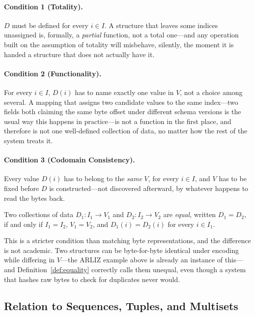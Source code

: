 \paragraph{Condition 1 (Totality).}
$D$ must be defined for every $i \in I$. A structure that leaves some
indices unassigned is, formally, a \emph{partial} function, not a total
one---and any operation built on the assumption of totality will misbehave,
silently, the moment it is handed a structure that does not actually have it.

\paragraph{Condition 2 (Functionality).}
For every $i \in I$, $D(i)$ has to name exactly one value in $V$, not a
choice among several. A mapping that assigns two candidate values to the
same index---two fields both claiming the same byte offset under
different schema versions is the usual way this happens in
practice---is not a function in the first place, and therefore is not one
well-defined collection of data, no matter how the rest of the system
treats it.

\paragraph{Condition 3 (Codomain Consistency).}
Every value $D(i)$ has to belong to the \emph{same} $V$, for every $i \in
I$, and $V$ has to be fixed before $D$ is constructed---not discovered
afterward, by whatever happens to read the bytes back.

\begin{definition}
\label{def:equality}
Two collections of data $D_1 : I_1 \to V_1$ and $D_2 : I_2 \to V_2$ are
\emph{equal}, written $D_1 = D_2$, if and only if $I_1 = I_2$, $V_1 = V_2$,
and $D_1(i) = D_2(i)$ for every $i \in I_1$.
\end{definition}

This is a stricter condition than matching byte representations, and the
difference is not academic. Two structures can be byte-for-byte identical
under encoding while differing in $V$---the ARLIZ example above is
already an instance of this---and Definition~\ref{def:equality} correctly
calls them unequal, even though a system that hashes raw bytes to check
for duplicates never would.

\subsection{Relation to Sequences, Tuples, and Multisets}

